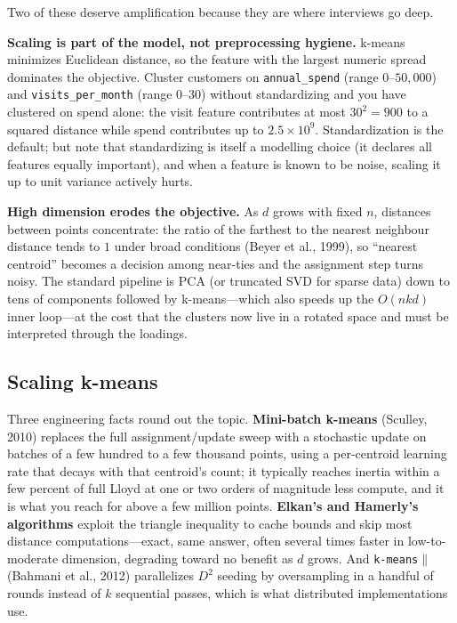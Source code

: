 Two of these deserve amplification because they are where interviews go deep.

\textbf{Scaling is part of the model, not preprocessing hygiene.} k-means minimizes Euclidean distance, so the feature with the largest numeric spread dominates the objective. Cluster customers on \texttt{annual\_spend} (range $0$--$50{,}000$) and \texttt{visits\_per\_month} (range $0$--$30$) without standardizing and you have clustered on spend alone: the visit feature contributes at most $30^2 = 900$ to a squared distance while spend contributes up to $2.5\times 10^9$. Standardization is the default; but note that standardizing is itself a modelling choice (it declares all features equally important), and when a feature is known to be noise, scaling it up to unit variance actively hurts.

\textbf{High dimension erodes the objective.} As $d$ grows with fixed $n$, distances between points concentrate: the ratio of the farthest to the nearest neighbour distance tends to $1$ under broad conditions (Beyer et al., 1999), so ``nearest centroid'' becomes a decision among near-ties and the assignment step turns noisy. The standard pipeline is PCA (or truncated SVD for sparse data) down to tens of components followed by k-means---which also speeds up the $O(nkd)$ inner loop---at the cost that the clusters now live in a rotated space and must be interpreted through the loadings.

\subsection{Scaling k-means}

Three engineering facts round out the topic. \textbf{Mini-batch k-means} (Sculley, 2010) replaces the full assignment/update sweep with a stochastic update on batches of a few hundred to a few thousand points, using a per-centroid learning rate that decays with that centroid's count; it typically reaches inertia within a few percent of full Lloyd at one or two orders of magnitude less compute, and it is what you reach for above a few million points. \textbf{Elkan's and Hamerly's algorithms} exploit the triangle inequality to cache bounds and skip most distance computations---exact, same answer, often several times faster in low-to-moderate dimension, degrading toward no benefit as $d$ grows. And \texttt{k-means}$\|$ (Bahmani et al., 2012) parallelizes $D^2$ seeding by oversampling in a handful of rounds instead of $k$ sequential passes, which is what distributed implementations use.

